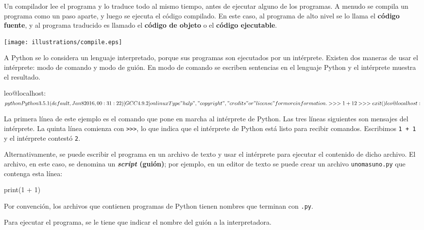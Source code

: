 Un compilador lee el programa y lo traduce todo al mismo tiempo,
antes de ejecutar alguno de los programas. A menudo se compila un
programa como un paso aparte, y luego se ejecuta el código
compilado. En este caso, al programa de alto nivel se lo llama el
{\bf código fuente}, y al programa traducido es llamado el {\bf
código de objeto} o el {\bf código ejecutable}.

\vspace{0.1in}
\centerline{\texttt{[image: illustrations/compile.eps]}}
\vspace{0.1in}

A Python se lo considera un lenguaje interpretado, porque sus programas
son ejecutados por un intérprete. Existen dos maneras
de usar el intérprete: modo de comando y modo de guión. En modo
de comando se escriben sentencias en el lenguaje Python y
el intérprete muestra el resultado.

\begin{pyconcode}
leo@localhost: $ python
Python 3.5.1 (default, Jan  8 2016, 00:31:22) 
[GCC 4.9.2] on linux
Type "help", "copyright", "credits" or "license" for more 
information.
>>> 1 + 1
2
>>> exit()
leo@localhost: $
\end{pyconcode} 


La primera línea de este ejemplo es el comando que pone en marcha
al intérprete de Python. Las tres líneas siguientes son mensajes
del intérprete. La quinta línea comienza con \texttt{>>>}, lo que
indica que el intérprete de Python está listo para recibir comandos.
Escribimos \texttt{1 + 1} y el intérprete contestó \texttt{2}.

Alternativamente, se puede escribir el programa en un archivo de texto y
usar el intérprete para ejecutar el contenido de dicho
archivo. El archivo, en este caso, se denomina un {\bf \textit{script} (guión)};
por ejemplo, en un editor de texto se puede crear un archivo 
\texttt{unomasuno.py} que contenga esta línea:

\begin{pyconcode}
print(1 + 1)
\end{pyconcode}

Por convención, los archivos que contienen programas de Python 
tienen nombres que terminan con \texttt{.py}.

Para ejecutar el programa, se le tiene que indicar el nombre del
guión a la interpretadora.

